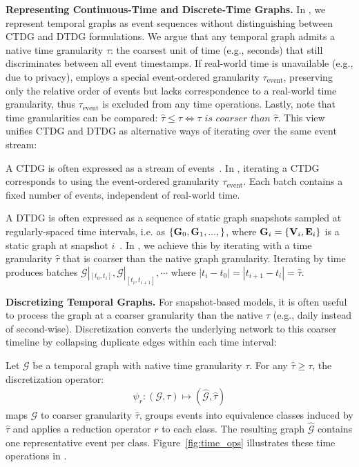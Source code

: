 \textbf{Representing Continuous-Time and Discrete-Time Graphs.} In \name, we represent temporal graphs as event sequences without distinguishing between CTDG and DTDG formulations. We argue that any temporal graph admits a native time granularity $\tau$: the coarsest unit of time (e.g., seconds) that still discriminates between all event timestamps. If real-world time is unavailable (e.g., due to privacy), \name employs a special event-ordered granularity $\tau_{\text{event}}$, preserving only the relative order of events but lacks correspondence to a real-world time granularity, thus $\tau_{\text{event}}$ is excluded from any time operations. Lastly, note that time granularities can be compared: $\hat{\tau} \leq \tau \iff \tau \textit{ is coarser than } \hat{\tau}$. This view unifies CTDG and DTDG as alternative ways of iterating over the same event stream:


 A CTDG is often expressed as a stream of events~\citep{DBLP:journals/jmlr/KazemiGJKSFP20,DBLP:conf/nips/HuangPDFHRLBRR23, tgn, DBLP:conf/kdd/YouDL22}. In \name, iterating a CTDG corresponds to using the event-ordered granularity $\tau_{\text{event}}$. Each batch contains a fixed number of events, independent of real-world time.

 A DTDG is often expressed as a sequence of static graph snapshots sampled at regularly-spaced time intervals, i.e. as $\{\mathbf{G}_0, \mathbf{G}_1, ..., \}$, where $\mathbf{G}_i = \{\mathbf{V}_i, \mathbf{E}_i\}$ is a static graph at snapshot $i$~\citep{utg}. 
In \name, we achieve this by iterating with a time granularity $\hat{\tau}$ that is coarser than the native graph granularity. Iterating by time produces batches $\mathcal{G}|_{[t_0, t_i]}, \mathcal{G}|_{[t_i, t_{i + 1}]}, \cdots$ where $|t_i - t_0| = |t_{i+1} - t_i| = \hat{\tau}$. 

\textbf{Discretizing Temporal Graphs.} For snapshot-based models, it is often useful to process the graph at a coarser granularity than the native $\tau$ (e.g., daily instead of second-wise). Discretization converts the underlying network to this coarser timeline by collapsing duplicate edges within each time interval:

 Let $\mathcal{G}$ be a temporal graph with native time granularity $\tau$. For any $\hat{\tau} \geq \tau$, the discretization operator:
\begin{align}
    \mathcal{\psi}_{r}: (\mathcal{G}, \tau) \mapsto (\hat{\mathcal{G}}, \hat{\tau})
\end{align}
maps $\mathcal{G}$ to coarser granularity $\hat{\tau}$, groups events into equivalence classes induced by $\hat{\tau}$ and applies a reduction operator $r$ to each class. The resulting graph 
$\hat{\mathcal{G}}$ contains one representative event per class. Figure~\ref{fig:time_ops} illustrates these time operations in \name.

